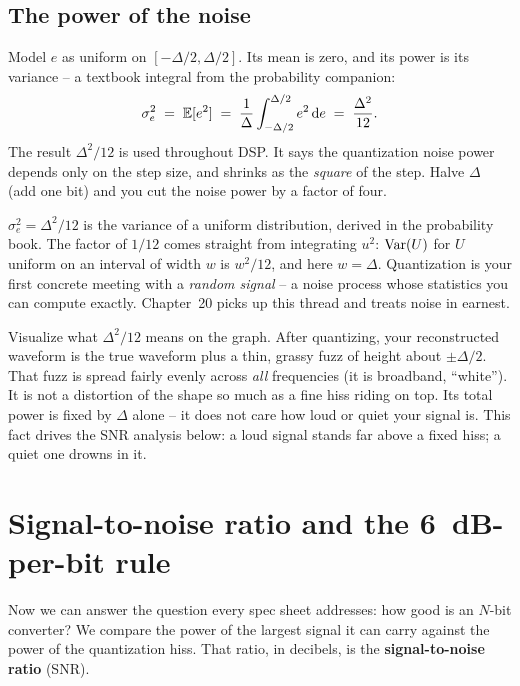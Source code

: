 \subsection*{The power of the noise}
Model $e$ as uniform on $[-\Delta/2, \Delta/2]$. Its mean is zero, and its power is its variance
-- a textbook integral from the probability companion:
\[
  \sigma_e^2 \;=\; \operatorname{\mathbb{E}}[e^2] \;=\; \frac{1}{\Delta}\int_{-\Delta/2}^{\Delta/2} e^2 \,\mathrm{d} e
  \;=\; \frac{\Delta^2}{12}.
\]
The result $\Delta^2/12$ is used throughout DSP. It says the
quantization noise power depends only on the step size, and shrinks as the \emph{square} of the
step. Halve $\Delta$ (add one bit) and you cut the noise power by a factor of four.

\begin{connectionbox}
$\sigma_e^2 = \Delta^2/12$ is the variance of a uniform distribution, derived in the
probability book. The factor of $1/12$ comes straight from integrating $u^2$: $\operatorname{Var}(U)$ for $U$ uniform on an interval of width $w$
is $w^2/12$, and here $w=\Delta$. Quantization is your first concrete meeting with a
\emph{random signal} -- a noise process whose statistics you can compute exactly. Chapter~20
picks up this thread and treats noise in earnest.
\end{connectionbox}

\begin{happeningbox}
Visualize what $\Delta^2/12$ means on the graph. After quantizing, your reconstructed waveform is
the true waveform plus a thin, grassy fuzz of height about $\pm\Delta/2$. That fuzz is spread
fairly evenly across \emph{all} frequencies (it is broadband, ``white''). It is not a distortion of
the shape so much as a fine hiss riding on top. Its total power is fixed by $\Delta$
alone -- it does not care how loud or quiet your signal is. This fact drives the
SNR analysis below: a loud signal stands far above a fixed hiss; a quiet one drowns in it.
\end{happeningbox}

\section{Signal-to-noise ratio and the 6~dB-per-bit rule}
\label{ch19:snr}

Now we can answer the question every spec sheet addresses: how good is an $N$-bit converter? We
compare the power of the largest signal it can carry against the power of the quantization hiss.
That ratio, in decibels, is the \textbf{signal-to-noise ratio} (SNR).

